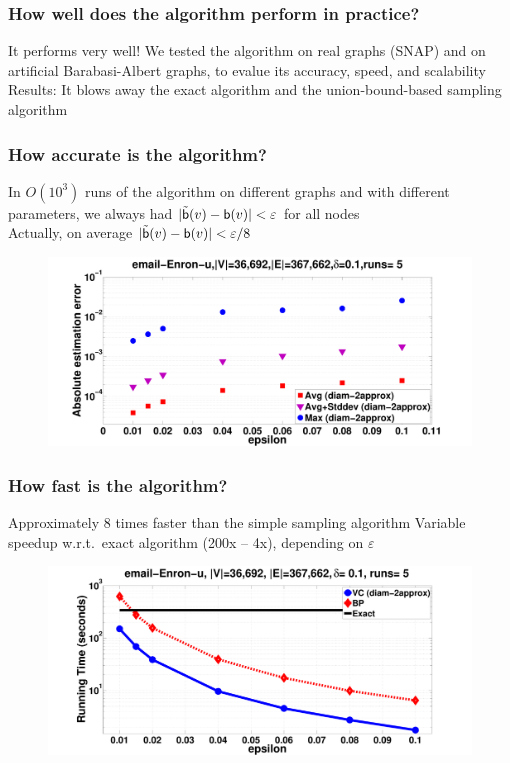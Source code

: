 \begin{frame}
  \frametitle{How well does the algorithm perform in practice?}
  It performs very well!
  \vfill
  We tested the algorithm on real graphs (SNAP) and on artificial
  Barabasi-Albert graphs, to evalue its accuracy, speed, and scalability
  \vfill
  Results: It blows away the exact algorithm and the union-bound-based
  sampling algorithm
\end{frame}

\begin{frame}
  \frametitle{How accurate is the algorithm?}
  In $O(10^3)$ runs of the algorithm on different graphs and with different
  parameters, we always had $|\tilde{\mathsf{b}}(v)-\mathsf{b}(v)|<\varepsilon$ for all
  nodes\\
  \quad Actually, on average $|\tilde{\mathsf{b}}(v)-\mathsf{b}(v)|<\varepsilon/8$
  \vfill
  \begin{figure}[H]
    \centering
    \includegraphics[width=\textwidth]{imgs/email-Enron-error.pdf}
  \end{figure}
\end{frame}

\begin{frame}
  \frametitle{How fast is the algorithm?}
  Approximately 8 times faster than the simple sampling algorithm
  \vfill
  Variable speedup w.r.t.~exact algorithm (200x -- 4x), depending on
  $\varepsilon$
  \vfill
  \begin{figure}[H]
    \centering
    \includegraphics[width=\textwidth]{imgs/email-Enron-time.pdf}
  \end{figure}
\end{frame}

